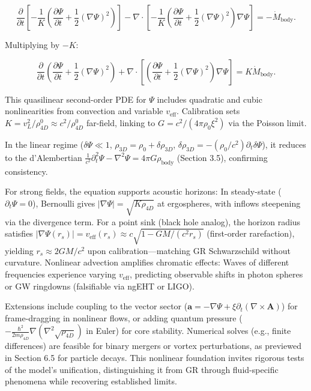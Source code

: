 \documentclass{article}
\begin{document}
\[
\frac{\partial}{\partial t} \left[ -\frac{1}{K} \left( \frac{\partial \Psi}{\partial t} + \frac{1}{2} (\nabla \Psi)^2 \right) \right] - \nabla \cdot \left[ -\frac{1}{K} \left( \frac{\partial \Psi}{\partial t} + \frac{1}{2} (\nabla \Psi)^2 \right) \nabla \Psi \right] = -\dot{M}_{\text{body}}.
\]

Multiplying by $-K$:

\[
\frac{\partial}{\partial t} \left( \frac{\partial \Psi}{\partial t} + \frac{1}{2} (\nabla \Psi)^2 \right) + \nabla \cdot \left[ \left( \frac{\partial \Psi}{\partial t} + \frac{1}{2} (\nabla \Psi)^2 \right) \nabla \Psi \right] = K \dot{M}_{\text{body}}.
\]

This quasilinear second-order PDE for $\Psi$ includes quadratic and cubic nonlinearities from convection and variable $v_{\text{eff}}$. Calibration sets $K = v_L^2 / \rho_{4D}^0 \approx c^2 / \rho_{4D}^0$ far-field, linking to $G = c^2 / (4\pi \rho_0 \xi^2)$ via the Poisson limit.

In the linear regime ($\delta \Psi \ll 1$, $\rho_{3D} = \rho_0 + \delta \rho_{3D}$, $\delta \rho_{3D} = -(\rho_0 / c^2) \partial_t \delta \Psi$), it reduces to the d'Alembertian $\frac{1}{c^2} \partial_t^2 \Psi - \nabla^2 \Psi = 4\pi G \rho_{\text{body}}$ (Section 3.5), confirming consistency.

For strong fields, the equation supports acoustic horizons: In steady-state ($\partial_t \Psi = 0$), Bernoulli gives $|\nabla \Psi| = \sqrt{K \rho_{4D}}$ at ergospheres, with inflows steepening via the divergence term. For a point sink (black hole analog), the horizon radius satisfies $|\nabla \Psi(r_s)| = v_{\text{eff}}(r_s) \approx c \sqrt{1 - GM/(c^2 r_s)}$ (first-order rarefaction), yielding $r_s \approx 2GM/c^2$ upon calibration---matching GR Schwarzschild without curvature. Nonlinear advection amplifies chromatic effects: Waves of different frequencies experience varying $v_{\text{eff}}$, predicting observable shifts in photon spheres or GW ringdowns (falsifiable via ngEHT or LIGO).

Extensions include coupling to the vector sector ($\mathbf{a} = -\nabla \Psi + \xi \partial_t (\nabla \times \mathbf{A})$) for frame-dragging in nonlinear flows, or adding quantum pressure ($-\frac{\hbar^2}{2m \rho_{4D}} \nabla (\nabla^2 \sqrt{\rho_{4D}})$ in Euler) for core stability. Numerical solves (e.g., finite differences) are feasible for binary mergers or vortex perturbations, as previewed in Section 6.5 for particle decays. This nonlinear foundation invites rigorous tests of the model's unification, distinguishing it from GR through fluid-specific phenomena while recovering established limits.
\end{document}
